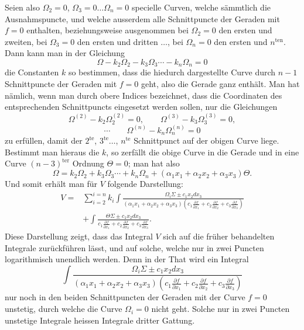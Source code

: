 \documentclass[10pt]{article}
\begin{document}
Seien also $\Omega_2=0$, $\Omega_3=0\ldots\Omega_n=0$ specielle Curven, welche sämmtlich die Ausnahmspuncte, und welche ausserdem alle Schnittpuncte der Geraden mit $f=0$ enthalten, beziehungsweise ausgenommen bei $\Omega_2=0$ den ersten und zweiten, bei $\Omega_3=0$ den ersten und dritten $\ldots$, bei $\Omega_n=0$ den ersten und $n^{\mathrm{ten}}$. Dann kann man in der Gleichung
\[
\Omega-k_2\Omega_2-k_3\Omega_3\cdots-k_n\Omega_n=0
\]
die Constanten $k$ so bestimmen, dass die hiedurch dargestellte Curve durch $n-1$ Schnittpuncte der Geraden mit $f=0$ geht, also die Gerade ganz enthält. Man hat nämlich, wenn man durch obere Indices bezeichnet, dass die Coordinaten des entsprechenden Schnittpuncts eingesetzt werden sollen, nur die Gleichungen
\[
\Omega^{(2)}-k_2\Omega_2^{(2)}=0,
\qquad
\Omega^{(3)}-k_3\Omega_3^{(3)}=0,
\]
\[
\cdots
\qquad
\Omega^{(n)}-k_n\Omega_n^{(n)}=0
\]
zu erfüllen, damit der $2^{\mathrm{te}}$, $3^{\mathrm{te}}\ldots$, $n^{\mathrm{te}}$ Schnittpunct auf der obigen Curve liege. Bestimmt man hieraus die $k$, so zerfällt die obige Curve in die Gerade und in eine Curve $(n-3)^{\mathrm{ter}}$ Ordnung $\Theta=0$; man hat also
\[
\Omega=k_2\Omega_2+k_3\Omega_3\cdots+k_n\Omega_n+(\alpha_1x_1+\alpha_2x_2+\alpha_3x_3)\Theta.
\]
Und somit erhält man für $V$ folgende Darstellung:
\[
\begin{aligned}
V={}&\sum_{i=2}^{i=n}k_i\int
\frac{\Omega_i\Sigma\pm c_1x_2dx_3}{(\alpha_1x_1+\alpha_2x_2+\alpha_3x_3)\left(c_1\frac{\partial f}{\partial x_1}+c_2\frac{\partial f}{\partial x_2}+c_3\frac{\partial f}{\partial x_3}\right)}\\
&+\int\frac{\Theta\Sigma\pm c_1x_2dx_3}{c_1\frac{\partial f}{\partial x_1}+c_2\frac{\partial f}{\partial x_2}+c_3\frac{\partial f}{\partial x_3}}.
\end{aligned}
\]
Diese Darstellung zeigt, dass das Integral $V$ sich auf die früher behandelten Integrale zurückführen lässt, und auf solche, welche nur in zwei Puncten logarithmisch unendlich werden. Denn in der That wird ein Integral
\[
\int\frac{\Omega_i\Sigma\pm c_1x_2dx_3}{(\alpha_1x_1+\alpha_2x_2+\alpha_3x_3)\left(c_1\frac{\partial f}{\partial x_1}+c_2\frac{\partial f}{\partial x_2}+c_3\frac{\partial f}{\partial x_3}\right)}
\]
nur noch in den beiden Schnittpuncten der Geraden mit der Curve $f=0$ unstetig, durch welche die Curve $\Omega_i=0$ nicht geht. Solche nur in zwei Puncten unstetige Integrale heissen Integrale dritter Gattung.
\end{document}
